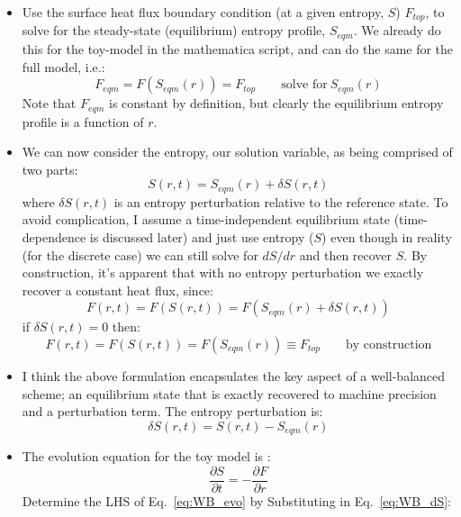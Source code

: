 \begin{itemize}
\item Use the surface heat flux boundary condition (at a given entropy, $S$) $F_{top}$, to solve for the steady-state (equilibrium) entropy profile, $S_{eqm}$.  We already do this for the toy-model in the mathematica script, and can do the same for the full model, i.e.:
\begin{equation}
F_{eqm} = F(S_{eqm}(r)) = F_{top} \qquad \text{solve for}\ S_{eqm}(r)
\label{eq:WB_F}
\end{equation}
Note that $F_{eqm}$ is constant by definition, but clearly the equilibrium entropy profile is a function of $r$.
\item We can now consider the entropy, our solution variable, as being comprised of two parts:
\begin{equation}
S(r,t) = S_{eqm}(r) + \delta S(r,t)
\end{equation}
where $\delta S(r,t)$ is an entropy perturbation relative to the reference state.  To avoid complication, I assume a time-independent equilibrium state (time-dependence is discussed later) and just use entropy ($S$) even though in reality (for the discrete case) we can still solve for $dS/dr$ and then recover $S$.  By construction, it's apparent that with no entropy perturbation we exactly recover a constant heat flux, since:
\begin{equation}
F(r,t) = F ( S(r,t) ) = F( S_{eqm}(r) + \delta S(r,t) )
\end{equation}
if $\delta S(r,t)=0$ then:
\begin{equation}
F(r,t) = F ( S(r,t) ) = F( S_{eqm}(r) ) \equiv F_{top} \qquad \text{by construction}
\end{equation}
\item I think the above formulation encapsulates the key aspect of a well-balanced scheme; an equilibrium state that is exactly recovered to machine precision and a perturbation term.  The entropy perturbation is: 
\begin{equation}
\delta S(r,t) = S(r,t) - S_{eqm}(r)
\label{eq:WB_dS}
\end{equation}
\item The evolution equation for the toy model is \citep[Eq.~24,][]{BSW18}:
\begin{equation}
\frac{\partial S}{\partial t} = - \frac{\partial F}{\partial r}
\label{eq:WB_evo}
\end{equation}
Determine the LHS of Eq.~\ref{eq:WB_evo} by Substituting in Eq.~\ref{eq:WB_dS}:
\begin{equation}

\end{equation}
\end{itemize}
